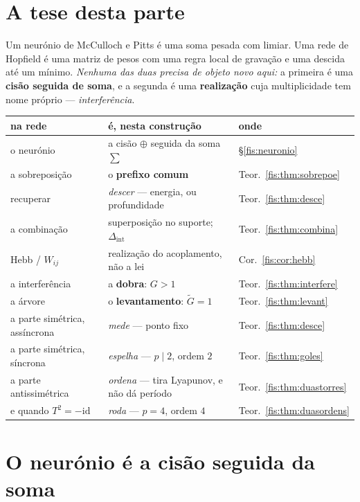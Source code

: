 \documentclass[livro.tex]{subfiles}
\begin{document}
\section*{A tese desta parte}\label{fis:redes-tese}

\noindent Um neurónio de McCulloch e Pitts é uma soma pesada com limiar. Uma rede
de Hopfield é uma matriz de pesos com uma regra local de gravação e uma descida
até um mínimo. \emph{Nenhuma das duas precisa de objeto novo aqui:} a primeira é
uma \textbf{cisão seguida de soma}, e a segunda é uma \textbf{realização} cuja
multiplicidade tem nome próprio --- \emph{interferência}.

\begin{center}\small
\begin{tabular}{@{}lll@{}}
\toprule
na rede & é, nesta construção & onde \\
\midrule
o neurónio & a cisão $\oplus$ seguida da soma $\sum$ & §\ref{fis:neuronio} \\
a sobreposição & o \textbf{prefixo comum} & Teor.~\ref{fis:thm:sobrepoe} \\
recuperar & \emph{descer} --- energia, ou profundidade & Teor.~\ref{fis:thm:desce} \\
a combinação & superposição no suporte; $\Delta_{\mathrm{int}}$ & Teor.~\ref{fis:thm:combina} \\
Hebb / $W_{ij}$ & realização do acoplamento, não a lei & Cor.~\ref{fis:cor:hebb} \\
a interferência & a \textbf{dobra}: $G>1$ & Teor.~\ref{fis:thm:interfere} \\
a árvore & o \textbf{levantamento}: $\tilde G=1$ & Teor.~\ref{fis:thm:levant} \\
a parte simétrica, assíncrona & \emph{mede} --- ponto fixo & Teor.~\ref{fis:thm:desce} \\
a parte simétrica, síncrona & \emph{espelha} --- $p\mid2$, ordem $2$ & Teor.~\ref{fis:thm:goles} \\
a parte antissimétrica & \emph{ordena} --- tira Lyapunov, e não dá período & Teor.~\ref{fis:thm:duastorres} \\
e quando $T^{2}=-\mathrm{id}$ & \emph{roda} --- $p=4$, ordem $4$ & Teor.~\ref{fis:thm:duasordens} \\\bottomrule
\end{tabular}
\end{center}

\section{O neurónio é a cisão seguida da soma}\label{fis:redes-neuronio}
\end{document}
